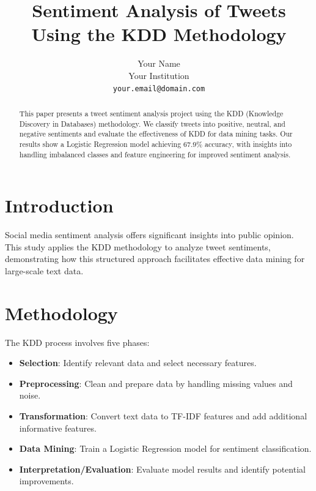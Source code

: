 \documentclass{article}
\title{Sentiment Analysis of Tweets Using the KDD Methodology}
\author{Your Name \\
        Your Institution \\
        \texttt{your.email@domain.com}}
\date{}
\begin{document}
\maketitle

\begin{abstract}
This paper presents a tweet sentiment analysis project using the KDD (Knowledge Discovery in Databases) methodology. We classify tweets into positive, neutral, and negative sentiments and evaluate the effectiveness of KDD for data mining tasks. Our results show a Logistic Regression model achieving 67.9\% accuracy, with insights into handling imbalanced classes and feature engineering for improved sentiment analysis.
\end{abstract}

\section{Introduction}
Social media sentiment analysis offers significant insights into public opinion. This study applies the KDD methodology to analyze tweet sentiments, demonstrating how this structured approach facilitates effective data mining for large-scale text data.

\section{Methodology}
The KDD process involves five phases:
\begin{itemize}
    \item \textbf{Selection}: Identify relevant data and select necessary features.
    \item \textbf{Preprocessing}: Clean and prepare data by handling missing values and noise.
    \item \textbf{Transformation}: Convert text data to TF-IDF features and add additional informative features.
    \item \textbf{Data Mining}: Train a Logistic Regression model for sentiment classification.
    \item \textbf{Interpretation/Evaluation}: Evaluate model results and identify potential improvements.
\end{itemize}
\end{document}
